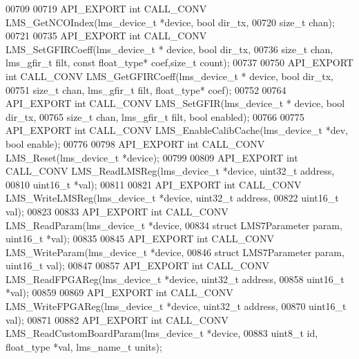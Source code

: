 \begin{DoxyCode}
00709 
00719 API_EXPORT \textcolor{keywordtype}{int} CALL_CONV LMS_GetNCOIndex(lms\_device\_t *device, \textcolor{keywordtype}{bool} dir_tx,
00720                                         \textcolor{keywordtype}{size\_t} chan);
00721 
00735 API_EXPORT \textcolor{keywordtype}{int} CALL_CONV LMS_SetGFIRCoeff(lms\_device\_t * device, \textcolor{keywordtype}{bool} dir_tx,
00736              \textcolor{keywordtype}{size\_t} chan, lms\_gfir\_t filt, \textcolor{keyword}{const} float\_type* coef,\textcolor{keywordtype}{size\_t} count);
00737 
00750 API_EXPORT \textcolor{keywordtype}{int} CALL_CONV LMS_GetGFIRCoeff(lms\_device\_t * device, \textcolor{keywordtype}{bool} dir_tx,
00751                                 \textcolor{keywordtype}{size\_t} chan, lms\_gfir\_t filt, float\_type* coef);
00752 
00764 API_EXPORT \textcolor{keywordtype}{int} CALL_CONV LMS_SetGFIR(lms\_device\_t * device, \textcolor{keywordtype}{bool} dir_tx,
00765                                     \textcolor{keywordtype}{size\_t} chan, lms\_gfir\_t filt, \textcolor{keywordtype}{bool} enabled);
00766 
00775 API_EXPORT \textcolor{keywordtype}{int} CALL_CONV LMS_EnableCalibCache(lms\_device\_t *dev, \textcolor{keywordtype}{bool} enable);
00776 
00798 API_EXPORT \textcolor{keywordtype}{int} CALL_CONV LMS_Reset(lms\_device\_t *device);
00799 
00809 API_EXPORT \textcolor{keywordtype}{int} CALL_CONV LMS_ReadLMSReg(lms\_device\_t *device, uint32\_t address,
00810                                         uint16\_t *val);
00811 
00821 API_EXPORT \textcolor{keywordtype}{int} CALL_CONV LMS_WriteLMSReg(lms\_device\_t *device, uint32\_t address,
00822                                         uint16\_t val);
00823 
00833 API_EXPORT \textcolor{keywordtype}{int} CALL_CONV LMS_ReadParam(lms\_device\_t *device,
00834                                      \textcolor{keyword}{struct} LMS7Parameter param, uint16\_t *val);
00835 
00845 API_EXPORT \textcolor{keywordtype}{int} CALL_CONV LMS_WriteParam(lms\_device\_t *device,
00846                                       \textcolor{keyword}{struct} LMS7Parameter param, uint16\_t val);
00847 
00857 API_EXPORT \textcolor{keywordtype}{int} CALL_CONV LMS_ReadFPGAReg(lms\_device\_t *device, uint32\_t address,
00858                                         uint16\_t *val);
00859 
00869 API_EXPORT \textcolor{keywordtype}{int} CALL_CONV LMS_WriteFPGAReg(lms\_device\_t *device, uint32\_t address,
00870                                         uint16\_t val);
00871 
00882 API_EXPORT \textcolor{keywordtype}{int} CALL_CONV LMS_ReadCustomBoardParam(lms\_device\_t *device,
00883                                  uint8\_t \textcolor{keywordtype}{id}, float\_type *val, lms\_name\_t units);

\end{DoxyCode}
